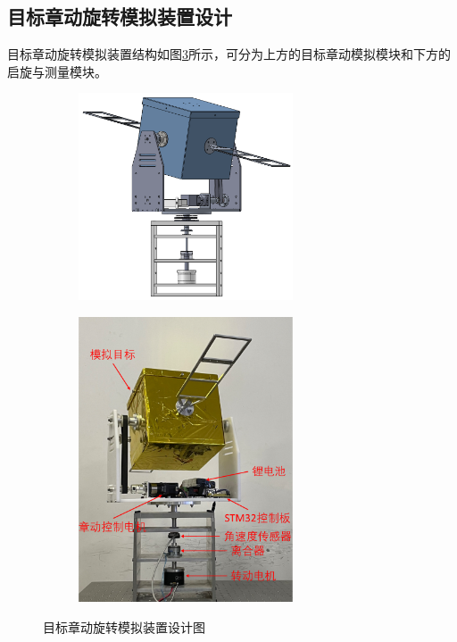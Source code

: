 \documentclass[lang=chs, degree=master, blindreview=false, winfonts=true]{yanputhesis}
\begin{document}
\subsection{目标章动旋转模拟装置设计}
目标章动旋转模拟装置结构如图\ref{Fig.tar_sys_all}所示，可分为上方的目标章动模拟模块和下方的启旋与测量模块。
\begin{figure}[htbp]
	\centering
	\begin{minipage}[t]{0.96\textwidth}
		\centering
		\begin{subfigure}[t]{0.47\textwidth}
			\centering
			\includegraphics[width = 2.5in]{picture/target_sys_solidwork.png}
			\caption{ }
			\label{fig:tar_sys_solidwork}
		\end{subfigure}\hfill
		\begin{subfigure}[t]{0.47\textwidth}
			\centering
			\includegraphics[width = 2.5in]{picture/target_sys.pdf}
			\caption{ }
			\label{fig:tar_sys}
		\end{subfigure}
	\end{minipage}
	\caption{目标章动旋转模拟装置设计图\label{Fig.tar_sys_all}}
\end{figure}
\end{document}

